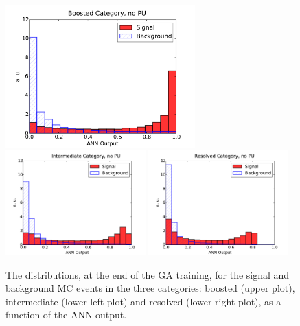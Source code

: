 \begin{figure}[t]
\begin{center}
\includegraphics[width=0.65\textwidth]{plots/Boosted_disc_noPU.pdf}
\includegraphics[width=0.48\textwidth]{plots/Intermediate_disc_noPU.pdf}
\includegraphics[width=0.48\textwidth]{plots/Resolved_disc_noPU.pdf}
\caption{\small The distributions, at the end of the
  GA training, 
  for the signal and background MC events in the three categories:
  boosted (upper plot), intermediate (lower left plot) and
  resolved (lower right plot), as a function of the ANN output.
}
\label{fig:nnresponse}
\end{center}
\end{figure}

